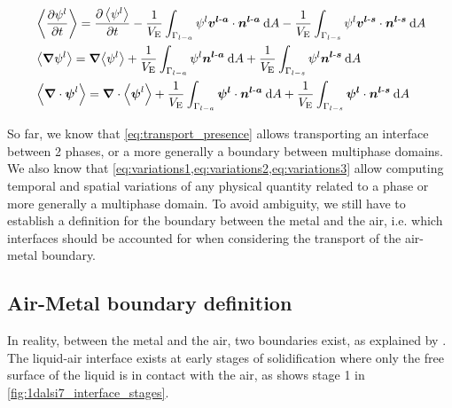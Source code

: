 \begin{align}
\label{eq:variations1}
& \left \langle {\ensuremath{\frac{\partial \psi^l}{\partial t} }} \right \rangle = \frac{\partial \left \langle \psi^l \right \rangle}{\partial t} 
							- \frac{1}{V_\text{E}} \int_{\Gamma_{l-a}} \psi^l \boldsymbol{v^{l\text{-}a}} \cdot \boldsymbol{n^{l\text{-}a}}\: \mathrm{d}A
							- \frac{1}{V_\text{E}} \int_{\Gamma_{l-s}} \psi^l \boldsymbol{v^{l\text{-}s}} \cdot \boldsymbol{n^{l\text{-}s}}\: \mathrm{d}A \\
\label{eq:variations2}
& \left \langle \boldsymbol{\nabla} \psi^l \right \rangle =  \boldsymbol{\nabla}{\left \langle \psi^l \right \rangle} 
							+ \frac{1}{V_\text{E}} \int_{\Gamma_{l-a}} \psi^l \boldsymbol{n^{l\text{-}a}}\: \mathrm{d}A 
							+\frac{1}{V_\text{E}} \int_{\Gamma_{l-s}} \psi^l \boldsymbol{n^{l\text{-}s}} \: \mathrm{d}A \\
\label{eq:variations3}
& \left \langle \boldsymbol{\nabla} \cdot \boldsymbol{\psi}^l \right \rangle =  \boldsymbol{\nabla} \cdot {\ensuremath{\left \langle \boldsymbol{\psi}^l \right \rangle}} 
							+ \frac{1}{V_\text{E}} \int_{\Gamma_{l-a}} \boldsymbol{\psi^l} \cdot \boldsymbol{n^{l\text{-}a}} \: \mathrm{d}A 
							+\frac{1}{V_\text{E}} \int_{\Gamma_{l-s}} \boldsymbol{\psi^l} \cdot  \boldsymbol{n^{l\text{-}s}} \: \mathrm{d}A							
\end{align}

So far, we know that \cref{eq:transport_presence} allows transporting an interface between 2 phases, 
or a more generally a boundary between multiphase domains.
We also know that \cref{eq:variations1,eq:variations2,eq:variations3} allow computing temporal and spatial
variations of any physical quantity related to a phase or more generally a multiphase domain.
To avoid ambiguity, we still have to establish a definition for the boundary between the metal and the air, i.e. which 
interfaces should be accounted for when considering the transport of the air-metal boundary.



\subsection{Air-Metal boundary definition} 

In reality, between the metal and the air, two boundaries exist, as explained by \citet{niane_etude_2004}. 
The liquid-air interface exists at early stages of solidification where only the free surface of the liquid is in contact with the air, as shows stage 1 in  \cref{fig:1dalsi7_interface_stages}.

